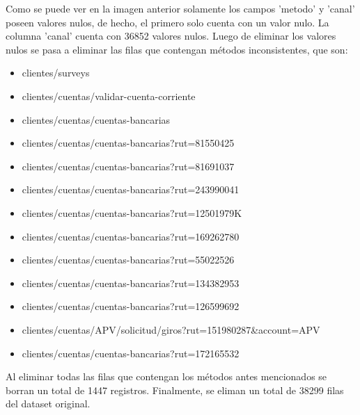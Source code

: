 Como se puede ver en la imagen anterior solamente los campos 'metodo' y 'canal' poseen valores nulos, de hecho, el primero solo cuenta con un valor nulo. La columna 'canal' cuenta con 36852 valores nulos. Luego de eliminar los valores nulos se pasa a eliminar las filas que contengan métodos inconsistentes, que son:
\begin{itemize}
    \item clientes/surveys
    \item clientes/cuentas/validar-cuenta-corriente
    \item clientes/cuentas/cuentas-bancarias
    \item clientes/cuentas/cuentas-bancarias?rut=81550425
    \item clientes/cuentas/cuentas-bancarias?rut=81691037
    \item clientes/cuentas/cuentas-bancarias?rut=243990041
    \item clientes/cuentas/cuentas-bancarias?rut=12501979K
    \item clientes/cuentas/cuentas-bancarias?rut=169262780
    \item clientes/cuentas/cuentas-bancarias?rut=55022526
    \item clientes/cuentas/cuentas-bancarias?rut=134382953
    \item clientes/cuentas/cuentas-bancarias?rut=126599692
    \item clientes/cuentas/APV/solicitud/giros?rut=151980287\&account=APV
    \item clientes/cuentas/cuentas-bancarias?rut=172165532
\end{itemize}

Al eliminar todas las filas que contengan los métodos antes mencionados se borran un total de 1447 registros. Finalmente, se eliman un total de 38299 filas del dataset original.